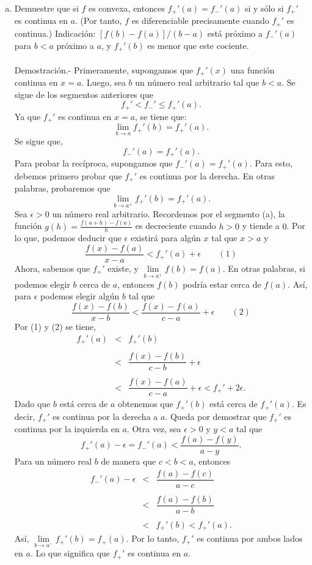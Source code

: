 \begin{enumerate}[\bfseries 1.]
\begin{enumerate}[(a)]
	
	    \item Demuestre que si $f$ es convexa, entonces $f_+'(a)=f_-'(a)$ si y sólo si $f_+'$ es continua en $a$. (Por tanto, $f$ es diferenciable precisamente cuando $f_+'$ es continua.) Indicación: $[f(b)-f(a)]/(b-a)$ está próximo a $f_-'(a)$ para $b<a$ próximo a $a$, y $f_+'(b)$ es menor que este cociente.\\\\
		Demostración.-\; Primeramente, supongamos que $f_+'(x)$ una función continua en $x=a$. Luego, sea $b$ un número real arbitrario tal que $b<a$. Se sigue de los segmentos anteriores que 
		$$f_+'<f_-'\leq f_+'(a).$$
		Ya que $f_+'$ es continua en $x=a$, se tiene que:
		$$\lim_{b\to a}f_ +'(b)=f_+'(a).$$
		Se sigue que,
		$$f_-'(a)=f_+'(a).$$
		Para probar la recíproca, supongamos que $f_-'(a)=f_+'(a)$. Para esto, debemos primero probar que $f_+'$ es continua por la derecha. En otras palabras, probaremos que
		$$\lim_{b\to a^+} f_+'(b)=f_+'(a).$$
		Sea $\epsilon>0$ un número real arbitrario. Recordemos por el segmento (a), la función $g(h)=\frac{f(a+h)-f(a)}{h}$ es decreciente cuando $h>0$ y tiende a $0$. Por lo que, podemos deducir que $\epsilon$ existirá para algún $x$ tal que $x>a$ y
		$$\dfrac{f(x)-f(a)}{x-a}<f_+'(a)+\epsilon \qquad (1)$$
		Ahora, sabemos que $f_+'$ existe, y $\lim\limits_{b\to a^+} f(b)=f(a)$. En otras palabras, si podemos elegir $b$ cerca de $a$, entonces $f(b)$ podría estar cerca de $f(a)$. Así, para $\epsilon$ podemos elegir algún $b$ tal que
		$$\dfrac{f(x)-f(b)}{x-b}<\dfrac{f(x)-f(a)}{c-a}+\epsilon \qquad (2)$$
		Por (1) y (2) se tiene,
		$$
		\begin{array}{rcl}
		    f_+'(a) &<& f_+'(b)\\\\
			 &<& \dfrac{f(x)-f(b)}{c-b}+\epsilon\\\\
			 &<& \dfrac{f(x)-f(a)}{c-a}+\epsilon< f_+'+2\epsilon.
		\end{array}
		$$
		Dado que $b$ está cerca de $a$ obtenemos que $f_+'(b)$ está cerca de $f_+'(a)$. Es decir, $f_+'$ es continua por la derecha a $a$.
		Queda por demostrar que $f_+'$ es continua por la izquierda en $a$. Otra vez, sea $\epsilon >0$ y $y<a$ tal que
		$$f_+'(a)-\epsilon=f_-'(a)<\dfrac{f(a)-f(y)}{a-y}.$$
		Para un número real $b$ de manera que $c<b<a$, entonces
		$$
		\begin{array}{rcl}
		    f_-'(a) - \epsilon &<& \dfrac{f(a)-f(c)}{a-c}\\\\
				       &<& \dfrac{f(a)-f(b)}{a-b}\\\\
				       &<& f_+'(b)<f_+'(a).
		\end{array}
		$$
		Así, $\lim\limits_{b\to a^-}f_+'(b)=f_+(a)$. Por lo tanto, $f_+'$ es continua por ambos lados en $a$. Lo que significa que $f_+'$ es continua en $a$.\\\\


\end{enumerate}
\end{enumerate}
